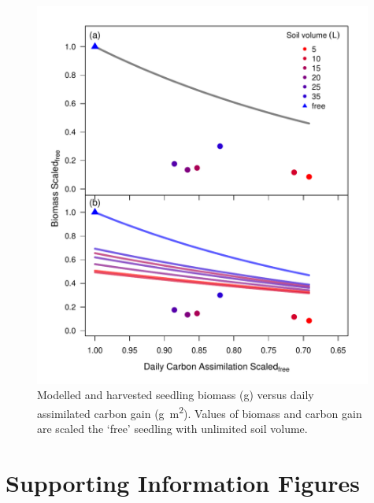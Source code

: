 \documentclass[a4paper]{article}\usepackage[]{graphicx}\usepackage[]{color}
\begin{document}
\begin{figure}[h!]
    \centering
    \includegraphics[width=0.99\textwidth]{gC_day.pdf}
    \caption{Modelled and harvested seedling biomass (g) versus daily assimilated carbon gain (g~m\textsuperscript{2}).  Values of biomass and carbon gain are scaled the ‘free’ seedling with unlimited soil volume.}
    \label{fig:figure6}
\end{figure}

\clearpage
\section{Supporting Information Figures}

\renewcommand\thefigure{S\arabic{figure}}    
\setcounter{figure}{0}   
\end{document}
